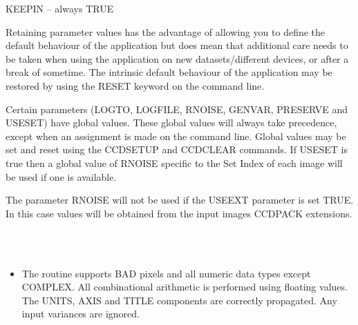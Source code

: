 \documentclass[twoside,11pt]{article}
\newcommand{\htmlref}[2]{#1}
\renewcommand{\_}{\texttt{\symbol{95}}}
\newcommand{\xroutine}[1]{\htmlref{{\sc #1}}{#1}}
\newcommand{\sstimplementationstatus}[1]{
   \item[{Implementation Status:}] \mbox{} \\[1.3ex] #1}
\newcommand{\sstitemlist}[1]{
  \mbox{} \\
  \vspace{-3.5ex}
  \begin{itemize}
     #1
  \end{itemize}
}
\newcommand{\sstitem}{\item}
\newcommand{\sstimplementationstatus}[1]{
      \item[Implementation Status:] #1
   }
\newcommand{\sstitemlist}[1]{
      \begin{itemize}
         #1
      \end{itemize}
      \\
   }
\newcommand{\sstitem}{\item}
\begin{document}
{{{         \sstitem
            KEEPIN  -- always TRUE

      }
      Retaining parameter values has the advantage of allowing you to
      define the default behaviour of the application but does mean
      that additional care needs to be taken when using the application
      on new datasets/different devices, or after a break of sometime.
      The intrinsic default behaviour of the application may be
      restored by using the RESET keyword on the command line.

      Certain parameters (LOGTO, LOGFILE, RNOISE, GENVAR, PRESERVE and USESET)
      have global values. These global values will always take
      precedence, except when an assignment is made on the command line.
      Global values may be set and reset using the \xroutine{CCDSETUP} and
      \xroutine{CCDCLEAR} commands.  If USESET is true then a global value
      of RNOISE specific to the Set Index of each image will be used
      if one is available.

      The parameter RNOISE will not be used if the USEEXT parameter is
      set TRUE. In this case values will be obtained from the input images
      CCDPACK extensions.
   }
\newpage
   \sstimplementationstatus{
      \sstitemlist{

         \sstitem
         The routine supports BAD pixels and all numeric data types
           except COMPLEX.  All combinational arithmetic is performed using
           floating values.  The UNITS, AXIS and TITLE components
           are correctly propagated. Any input variances are ignored.
      }
   }
}
\end{document}
